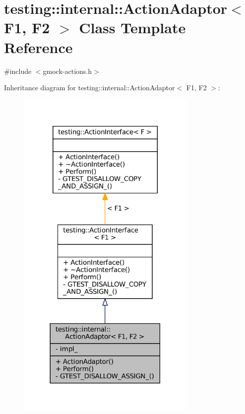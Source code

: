 \hypertarget{classtesting_1_1internal_1_1ActionAdaptor}{}\section{testing\+:\+:internal\+:\+:Action\+Adaptor$<$ F1, F2 $>$ Class Template Reference}
\label{classtesting_1_1internal_1_1ActionAdaptor}


{\ttfamily \#include $<$gmock-\/actions.\+h$>$}



Inheritance diagram for testing\+:\+:internal\+:\+:Action\+Adaptor$<$ F1, F2 $>$\+:
\nopagebreak
\begin{figure}[H]
\begin{center}
\leavevmode
\includegraphics[width=246pt]{classtesting_1_1internal_1_1ActionAdaptor__inherit__graph}
\end{center}
\end{figure}


